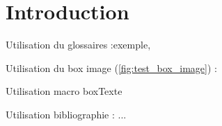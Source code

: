 \chapter{Introduction}
    \lipsum[1]
    
    \vspace{2pt}
    Utilisation du glossaires :\gls{exemple}, 

    \vspace{2pt}
    Utilisation du box image (\ref{fig:test_box_image}) : 
    
    \vspace{2pt}
    Utilisation macro boxTexte  


    \vspace{2pt}
    Utilisation bibliographie : ...\cite{musicclassification:book}

    
